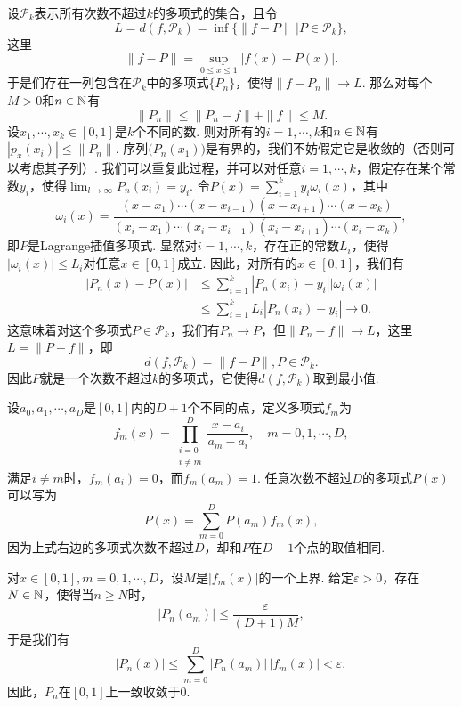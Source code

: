 \begin{ans}
  设$\mathcal P_k$表示所有次数不超过$k$的多项式的集合，且令
  \[ L=d(f,\mathcal P_k)=\inf\{\|f-P\|\,|P\in\mathcal P_k\}, \]
  这里
  \[ \|f-P\|=\sup_{0\le x\le1}|f(x)-P(x)|. \]
  于是们存在一列包含在$\mathcal P_k$中的多项式$\{P_n\}$，使得$\|f-P_n\|\to L$. 那么对每个$M>0$和$n\in\mathbb N$有
  \[ \|P_n\|\le\|P_n-f\|+\|f\| \le M. \]
  设$x_1,\cdots,x_k\in[0,1]$是$k$个不同的数. 则对所有的$i=1,\cdots,k$和$n\in\mathbb N$有$|p_x(x_i)|\le\|P_n\|$. 序列$\big(P_n(x_1)\big)$是有界的，我们不妨假定它是收敛的（否则可以考虑其子列）. 我们可以重复此过程，并可以对任意$i=1,\cdots,k$，假定存在某个常数$y_i$，使得$\lim_{l\to\infty}P_n(x_i)=y_i$. 令$P(x)=\sum_{i=1}^ky_i\omega_i(x)$，其中
  \[
    \omega_i(x)=\frac{(x-x_1)\cdots(x-x_{i-1})(x-x_{i+1})
    \cdots(x-x_k)}
    {(x_i-x_1)\cdots(x_i-x_{i-1})(x_i-x_{i+1})\cdots(x_i-x_k)},
  \]
  即$P$是Lagrange插值多项式. 显然对$i=1,\cdots,k$，存在正的常数$L_i$，使得$|\omega_i(x)|\le L_i$对任意$x\in[0,1]$成立. 因此，对所有的$x\in[0,1]$，我们有
  \begin{align*}
    |P_n(x)-P(x)|& \le \sum_{i=1}^k|P_n(x_i)-y_i||\omega_i(x)|\\
     & \le \sum_{i=1}^kL_i|P_n(x_i)-y_i| \to0.
  \end{align*}
  这意味着对这个多项式$P\in\mathcal P_k$，我们有$P_n\to P$，但$\|P_n-f\|\to L$，这里$L=\|P-f\|$，即
  \[ d(f,\mathcal P_k)=\|f-P\|,P\in\mathcal P_k. \]
  因此$P$就是一个次数不超过$k$的多项式，它使得$d(f,\mathcal P_k)$取到最小值.
\end{ans}

\begin{ans}
  设$a_0,a_1,\cdots,a_D$是$[0,1]$内的$D+1$个不同的点，定义多项式$f_m$为
  \[
    f_m(x) = \prod_{\substack{i=0\\i\ne m}}^D\frac{x-a_i}{a_m-a_i},\quad m=0,1,\cdots,D,
  \]
  满足$i\ne m$时，$f_m(a_i)=0$，而$f_m(a_m)=1$. 任意次数不超过$D$的多项式$P(x)$可以写为
  \[ P(x)=\sum_{m=0}^DP(a_m)f_m(x), \]
  因为上式右边的多项式次数不超过$D$，却和$P$在$D+1$个点的取值相同.

  对$x\in[0,1],m=0,1,\cdots,D$，设$M$是$|f_m(x)|$的一个上界. 给定$\varepsilon>0$，存在$N\in\mathbb N$，使得当$n\ge N$时，
     \[ |P_n(a_m)|\le\frac{\varepsilon}{(D+1)M}, \]
  于是我们有
     \[ |P_n(x)|\le\sum_{m=0}^D|P_n(a_m)|\,|f_m(x)|<\varepsilon, \]
  因此，$P_n$在$[0,1]$上一致收敛于0.
\end{ans}


